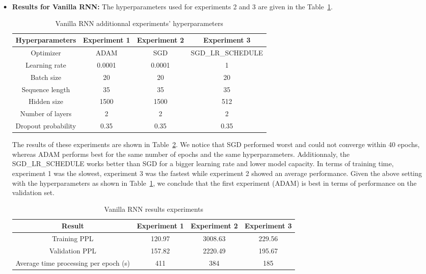 \begin{itemize}
	\item[1)] \textbf{Results for Vanilla RNN:}
	The hyperparameters used for experiments 2 and 3 are given in the Table~\ref{table:3}.\\
	\begin{table}[H]
		\centering
		\begin{tabular}{||c c c c||} 
			\hline
			\textbf{Hyperparameters} & \textbf{Experiment 1} &\textbf{Experiment 2} & \textbf{Experiment 3}\\[0.5ex] 
			\hline
			Optimizer & ADAM & SGD & SGD\_LR\_SCHEDULE \\
			Learning rate & 0.0001 & 0.0001 & 1  \\
			Batch size &20 & 20 &20 \\
			Sequence length &35 & 35 & 35\\
			Hidden size & 1500 & 1500 & 512 \\
			Number of layers & 2 & 2 & 2 \\
			Dropout probability & 0.35 & 0.35 &0.35 \\[1ex]
			\hline
		\end{tabular}
		\caption{Vanilla RNN additionnal experiments' hyperparameters}
		\label{table:3}
	\end{table}
	The results of these experiments are shown in  Table~\ref{table:3.1}. We notice that SGD performed worst and could not converge within 40 epochs, whereas ADAM performs best for the same number of epochs and the same hyperparameters. Additionnaly, the SGD\_LR\_SCHEDULE works better than SGD for a bigger learning rate and lower model capacity. In terms of training time, experiment 1 was the slowest, experiment 3 was the fastest while experiment 2 showed an average performance. 
	Given the above setting with the hyperparameters as shown in Table~\ref{table:3}, we conclude that the first experiment (ADAM) is best in terms of performance on the validation set. 
	\begin{table}[H]
		\centering
		\begin{tabular}{||c c c c||} 
			\hline
			\textbf{Result} & \textbf{Experiment 1} & \textbf{Experiment 2}& \textbf{Experiment 3} \\[0.5ex] 
			\hline
			Training PPL & 120.97 & 3008.63 & 229.56 \\
			Validation PPL & 157.82 & 2220.49 & 195.67  \\
			Average time processing per epoch (s) & 411 & 384 & 185 \\[1ex]
			\hline
		\end{tabular}
		\caption{Vanilla RNN results experiments}
		\label{table:3.1}
	\end{table}


\end{itemize}
